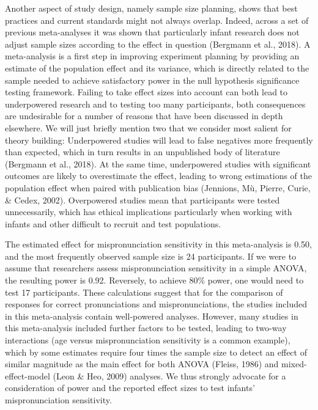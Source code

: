 \documentclass[man]{apa6}
\theoremstyle{definition}
\theoremstyle{definition}
\theoremstyle{definition}
\theoremstyle{remark}
\begin{document}
Another aspect of study design, namely sample size planning, shows that
best practices and current standards might not always overlap. Indeed,
across a set of previous meta-analyses it was shown that particularly
infant research does not adjust sample sizes according to the effect in
question (Bergmann et al., 2018). A meta-analysis is a first step in
improving experiment planning by providing an estimate of the population
effect and its variance, which is directly related to the sample needed
to achieve satisfactory power in the null hypothesis significance
testing framework. Failing to take effect sizes into account can both
lead to underpowered research and to testing too many participants, both
consequences are undesirable for a number of reasons that have been
discussed in depth elsewhere. We will just briefly mention two that we
consider most salient for theory building: Underpowered studies will
lead to false negatives more frequently than expected, which in turn
results in an unpublished body of literature (Bergmann et al., 2018). At
the same time, underpowered studies with significant outcomes are likely
to overestimate the effect, leading to wrong estimations of the
population effect when paired with publication bias (Jennions, Mù,
Pierre, Curie, \& Cedex, 2002). Overpowered studies mean that
participants were tested unnecessarily, which has ethical implications
particularly when working with infants and other difficult to recruit
and test populations.

The estimated effect for mispronunciation sensitivity in this
meta-analysis is 0.50, and the most frequently observed sample size is
24 participants. If we were to assume that researchers assess
mispronunciation sensitivity in a simple ANOVA, the resulting power is
0.92. Reversely, to achieve 80\% power, one would need to test 17
participants. These calculations suggest that for the comparison of
responses for correct pronunciations and mispronunciations, the studies
included in this meta-analysis contain well-powered analyses. However,
many studies in this meta-analysis included further factors to be
tested, leading to two-way interactions (age versus mispronunciation
sensitivity is a common example), which by some estimates require four
times the sample size to detect an effect of similar magnitude as the
main effect for both ANOVA (Fleiss, 1986) and mixed-effect-model (Leon
\& Heo, 2009) analyses. We thus strongly advocate for a consideration of
power and the reported effect sizes to test infants' mispronunciation
sensitivity.
\end{document}
